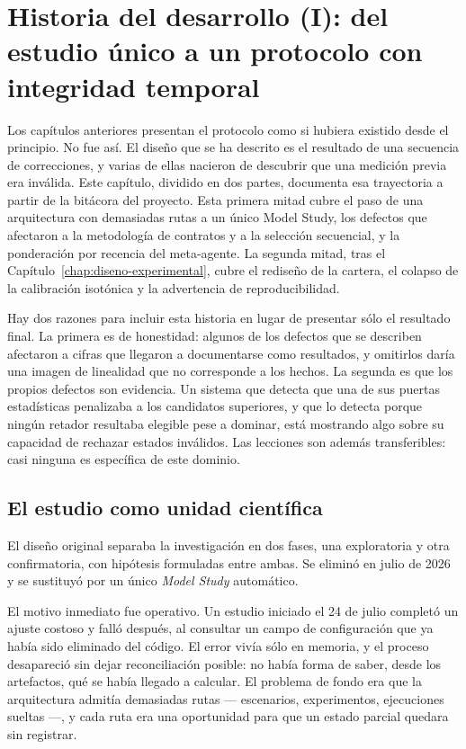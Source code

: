 \chapter{Historia del desarrollo (I): del estudio único a un protocolo con integridad temporal}
\label{chap:desarrollo-metodo}

Los capítulos anteriores presentan el protocolo como si hubiera existido desde el principio. No fue
así. El diseño que se ha descrito es el resultado de una secuencia de correcciones, y varias de
ellas nacieron de descubrir que una medición previa era inválida. Este capítulo, dividido en dos
partes, documenta esa trayectoria a partir de la bitácora del proyecto. Esta primera mitad cubre el
paso de una arquitectura con demasiadas rutas a un único Model Study, los defectos que afectaron a
la metodología de contratos y a la selección secuencial, y la ponderación por recencia del
meta-agente. La segunda mitad, tras el Capítulo~\ref{chap:diseno-experimental}, cubre el rediseño de
la cartera, el colapso de la calibración isotónica y la advertencia de reproducibilidad.

Hay dos razones para incluir esta historia en lugar de presentar sólo el resultado final. La primera
es de honestidad: algunos de los defectos que se describen afectaron a cifras que llegaron a
documentarse como resultados, y omitirlos daría una imagen de linealidad que no corresponde a los
hechos. La segunda es que los propios defectos son evidencia. Un sistema que detecta que una de sus
puertas estadísticas penalizaba a los candidatos superiores, y que lo detecta porque ningún retador
resultaba elegible pese a dominar, está mostrando algo sobre su capacidad de rechazar estados
inválidos. Las lecciones son además transferibles: casi ninguna es específica de este dominio.

\section{El estudio como unidad científica}

El diseño original separaba la investigación en dos fases, una exploratoria y otra confirmatoria,
con hipótesis formuladas entre ambas. Se eliminó en julio de 2026 y se sustituyó por un único
\textit{Model Study} automático.

El motivo inmediato fue operativo. Un estudio iniciado el 24 de julio completó un ajuste costoso y
falló después, al consultar un campo de configuración que ya había sido eliminado del código. El
error vivía sólo en memoria, y el proceso desapareció sin dejar reconciliación posible: no había
forma de saber, desde los artefactos, qué se había llegado a calcular. El problema de fondo era que
la arquitectura admitía demasiadas rutas --- escenarios, experimentos, ejecuciones sueltas ---, y
cada ruta era una oportunidad para que un estado parcial quedara sin registrar.

